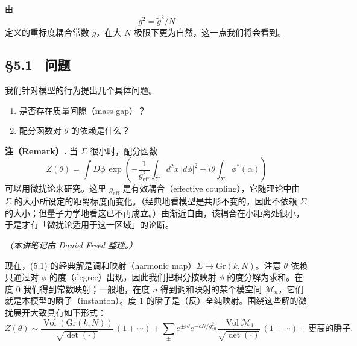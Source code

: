 由
\begin{equation}
  \tag{5.2}
  \label{eq:5-2}
  g^2=\tilde{g}^2/N
\end{equation}
定义的重标度耦合常数 $\tilde{g}$，在大 $N$ 极限下更为自然，这一点我们将会看到。


\subsection*{§5.1　问题}

我们针对模型的行为提出几个具体问题。

\begin{enumerate}
  \item 是否存在质量间隙（mass gap）？
  \item 配分函数对 $\theta$ 的依赖是什么？
\end{enumerate}

\noindent\textbf{注（Remark）.} 当 $\Sigma$ 很小时，配分函数
\[
  Z(\theta)=\int D\phi\,\exp\left(-\frac{1}{g_{\mathrm{eff}}^2}\int_\Sigma d^2x\,|d\phi|^2+i\theta\int_\Sigma\phi^*(\alpha)\right)
\]
可以用微扰论来研究。这里 $g_{\mathrm{eff}}$ 是有效耦合（effective coupling），它随理论中由 $\Sigma$ 的大小所设定的距离标度而变化。（经典地看模型是共形不变的，因此不依赖 $\Sigma$ 的大小；但量子力学地看这已不再成立。）由渐近自由，该耦合在小距离处很小，于是才有「微扰论适用于这一区域」的论断。

\noindent\textit{（本讲笔记由 Daniel Freed 整理。）}

现在，(5.1) 的经典解是调和映射（harmonic map）$\Sigma\to\mathrm{Gr}(k,N)$。注意 $\theta$ 依赖只通过对 $\phi$ 的度（degree）出现，因此我们把积分按映射 $\phi$ 的度分解为求和。在度 $0$ 我们得到常数映射；一般地，在度 $n$ 得到调和映射的某个模空间 $\mathcal{M}_n$，它们就是本模型的瞬子（instanton）。度 $1$ 的瞬子是（反）全纯映射。围绕这些解的微扰展开大致具有如下形式：
\begin{equation}
  \tag{5.3}
  \label{eq:5-3}
  Z(\theta)\sim\frac{\operatorname{Vol}(\mathrm{Gr}(k,N))}{\sqrt{\det(\cdot)}}\,(1+\cdots)
  +\sum_{\pm}e^{\pm i\theta}e^{-cN/g_{\mathrm{eff}}^2}\frac{\operatorname{Vol}\mathcal{M}_1}{\sqrt{\det(\cdot)}}\,(1+\cdots)
  +\text{更高的瞬子}.
\end{equation}


